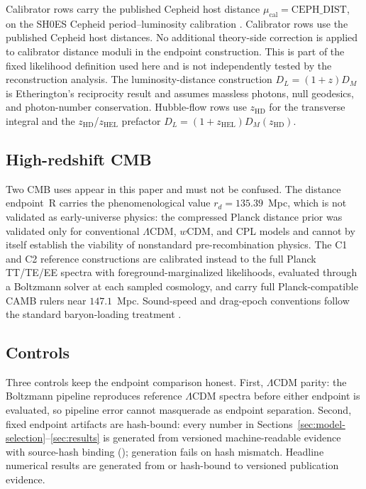 Calibrator rows carry the published Cepheid host distance
$\mu_{\mathrm{cal}}=\mathrm{CEPH\_DIST}$, on the SH0ES Cepheid
period--luminosity calibration \citep{Riess2019,Riess2022}.
Calibrator rows use the published Cepheid host distances. No additional theory-side correction is applied to calibrator distance moduli in the endpoint construction. This is part of the fixed likelihood definition used here and is not independently tested by the reconstruction analysis. The luminosity-distance construction
$D_{L}=(1+z)D_{M}$ is Etherington's reciprocity result
\citep{Etherington1933} and assumes massless photons, null geodesics, and
photon-number conservation. Hubble-flow rows use
$z_{\mathrm{HD}}$ for the transverse integral and the
$z_{\mathrm{HD}}$/$z_{\mathrm{HEL}}$ prefactor
$D_{L}=(1+z_{\mathrm{HEL}})D_{M}(z_{\mathrm{HD}})$.

\subsection{High-redshift CMB}

Two CMB uses appear in this paper and must not be confused. The
distance endpoint~R carries the phenomenological value
$r_{d}=135.39$~Mpc, which is not validated as early-universe physics:
the compressed Planck distance prior \citep{Chen2019} was validated
only for conventional $\Lambda$CDM, $w$CDM, and CPL models and
cannot by itself establish the viability of nonstandard
pre-recombination physics. The C1 and C2 reference constructions are
calibrated instead to the full Planck TT/TE/EE spectra with
foreground-marginalized likelihoods, evaluated through a Boltzmann
solver at each sampled cosmology, and carry full Planck-compatible
CAMB rulers near $147.1$~Mpc. Sound-speed and drag-epoch conventions
follow the standard baryon-loading treatment
\citep{EisensteinHu1998,HuSugiyama1996}.

\subsection{Controls}

Three controls keep the endpoint comparison honest. First, $\Lambda$CDM
parity: the Boltzmann pipeline reproduces reference $\Lambda$CDM
spectra before either endpoint is evaluated, so pipeline error cannot
masquerade as endpoint separation. Second, fixed endpoint artifacts
are hash-bound: every number in
Sections~\ref{sec:model-selection}--\ref{sec:results} is generated from
versioned machine-readable evidence with source-hash binding
(); generation fails on hash
mismatch. Headline numerical results are generated from or hash-bound
to versioned publication evidence.

